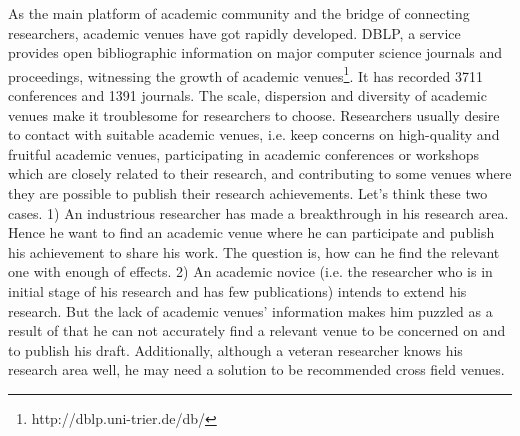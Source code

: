 \documentclass[9pt]{acm_proc_article-sp}
\begin{document}
As the main platform of academic community and the bridge of connecting researchers, academic venues have got rapidly developed. DBLP, a service provides open bibliographic information on major computer science journals and proceedings, witnessing the growth of academic venues\footnote{http://dblp.uni-trier.de/db/}. It has recorded 3711 conferences and 1391 journals. The scale, dispersion and diversity of academic venues make it troublesome for researchers to choose. Researchers usually desire to contact with suitable academic venues, i.e. keep concerns on high-quality and fruitful academic venues, participating in academic conferences or workshops which are closely related to their research, and contributing to some venues where they are possible to publish their research achievements. Let's think these two cases. 1) An industrious researcher has made a breakthrough in his research area. Hence he want to find an academic venue where he can participate and publish his achievement to share his work. The question is, how can he find the relevant one with enough of effects. 2) An academic novice (i.e. the researcher who is in initial stage of his research and has few publications) intends to extend his research. But the lack of academic venues' information makes him puzzled as a result of that he can not accurately find a relevant venue to be concerned on and to publish his draft. Additionally, although a veteran researcher knows his research area well, he may need a solution to be recommended cross field venues.
\end{document}

